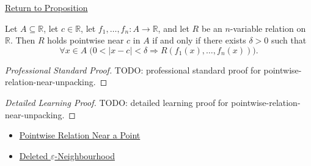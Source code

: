 \newpage
{}
\label{prf:pointwise-relation-near-unpacking}

\begin{remark*}[Return]
\hyperref[prop:pointwise-relation-near-unpacking]{Return to Proposition}
\end{remark*}

\begin{proposition*}
Let \(A\subseteq\mathbb{R}\), let \(c\in\mathbb{R}\), let
\(f_1,\ldots,f_n:A\to\mathbb{R}\), and let \(R\) be an \(n\)-variable
relation on \(\mathbb{R}\).  Then \(R\) holds pointwise near \(c\) in
\(A\) if and only if there exists \(\delta>0\) such that
\[
  \forall x\in A\;
  \bigl(0<|x-c|<\delta
  \Rightarrow R(f_1(x),\ldots,f_n(x))\bigr).
\]
\end{proposition*}

\begin{proof}[Professional Standard Proof]
\LRAProofBodyStart
TODO: professional standard proof for pointwise-relation-near-unpacking.
\end{proof}

\begin{proof}[Detailed Learning Proof]
\LRAProofBodyStart
TODO: detailed learning proof for pointwise-relation-near-unpacking.
\end{proof}

\begin{remark*}
\end{remark*}

\begin{dependencies}
\begin{itemize}
  \item \hyperref[def:pointwise-relation-near-point]{Pointwise Relation Near a Point}
  \item \hyperref[def:deleted-epsilon-neighbourhood]{Deleted \(\varepsilon\)-Neighbourhood}
\end{itemize}
\end{dependencies}

\clearpage
